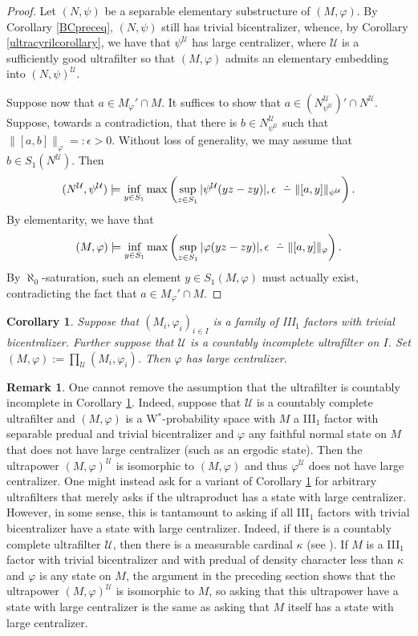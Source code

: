 \documentclass[12pt]{amsart}
\newtheorem{cor}[thm]{Corollary}
\theoremstyle{definition}
\newtheorem{remark}[thm]{Remark}
\newcommand{\dminus}{ 
\buildrel\textstyle\ .\over{\hbox{ 
\vrule height3pt depth0pt width0pt}{\smash-} 
}}
\def\cal{\mathcal}
\def\u{\mathsf 1}
\newcommand\cU{{\cal U}}
\def \u{\mathcal U}
\begin{document}
\begin{proof}
Let $(N,\psi)$ be a separable elementary substructure of $(M,\varphi)$.  By Corollary \ref{BCpreceq}, $(N,\psi)$ still has trivial bicentralizer, whence, by Corollary \ref{ultracyrilcorollary}, we have that $\psi^\cU$ has large centralizer, where $\cU$ is a sufficiently good ultrafilter so that $(M,\varphi)$ admits an elementary embedding into $(N,\psi)^\cU$.

Suppose now that $a\in M_\varphi'\cap M$.  It suffices to show that $a\in (N^{\u}_{\psi^\cU})'\cap N^\cU$.  Suppose, towards a contradiction, that there is $b\in N^\u_{\psi^\cU}$ such that $\|[a,b]\|_\varphi=:\epsilon>0$.  Without loss of generality, we may assume that $b\in S_1(N^{\cU})$.  Then 
$$(N^\cU,\psi^\cU)\models \inf_{y\in S_1}\max\left(\sup_{z\in S_1}|\psi^\u(yz-zy)|,\epsilon \dminus \|[a,y]\|_{\psi^{\cU}}\right).$$
By elementarity, we have that 
$$(M,\varphi)\models \inf_{y\in S_1}\max\left(\sup_{z\in S_1}|\varphi(yz-zy)|,\epsilon \dminus \|[a,y]\|_{\varphi}\right).$$
By $\aleph_0$-saturation, such an element $y\in S_1(M,\varphi)$ must actually exist, contradicting the fact that $a\in M_\varphi'\cap M$. 
\end{proof}

\begin{cor}\label{cor generalizing Haagerup for ultraproducts}
Suppose that $(M_i,\varphi_i)_{i\in I}$ is a family of III$_1$ factors with trivial bicentralizer.  Further suppose that $\cU$ is a countably incomplete ultrafilter on $I$.  Set $(M,\varphi):=\prod_\cU (M_i,\varphi_i)$.  Then $\varphi$ has large centralizer.
\end{cor}

\begin{remark}
One cannot remove the assumption that the ultrafilter is countably incomplete in Corollary \ref{cor generalizing Haagerup for ultraproducts}.  Indeed, suppose that $\u$ is a countably complete ultrafilter and $(M,\varphi)$ is a W$^*$-probability space with $M$ a III$_1$ factor with separable predual and trivial bicentralizer and $\varphi$ any faithful normal state on $M$ that does not have large centralizer (such as an ergodic state).  Then the ultrapower $(M,\varphi)^\u$ is isomorphic to $(M,\varphi)$ and thus $\varphi^\u$ does not have large centralizer.
One might instead ask for a variant of Corollary \ref{cor generalizing Haagerup for ultraproducts} for arbitrary ultrafilters that merely asks if the ultraproduct has a state with large centralizer.  However, in some sense, this is tantamount to asking if all III$_1$ factors with trivial bicentralizer have a state with large centralizer.  Indeed, if there is a countably complete ultrafilter $\u$, then there is a measurable cardinal $\kappa$ (see \cite[Proposition 17.3.4]{goldbring2022ultrafilters}).  If $M$ is a III$_1$ factor with trivial bicentralizer and with predual of density character less than $\kappa$ and $\varphi$ is any state on $M$, the argument in the preceding section shows that the ultrapower $(M,\varphi)^\u$ is isomorphic to $M$, so asking that this ultrapower have a state with large centralizer is the same as asking that $M$ itself has a state with large centralizer.
\end{remark}
\end{document}

